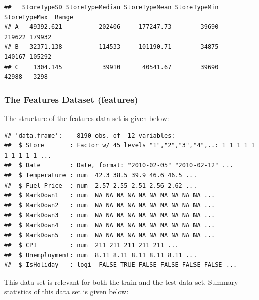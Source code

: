 \documentclass[]{article}
\begin{document}
\begin{verbatim}
##   StoreTypeSD StoreTypeMedian StoreTypeMean StoreTypeMin StoreTypeMax  Range
## A   49392.621          202406     177247.73        39690       219622 179932
## B   32371.138          114533     101190.71        34875       140167 105292
## C    1304.145           39910      40541.67        39690        42988   3298
\end{verbatim}

\subsubsection{The Features Dataset
(features)}\label{the-features-dataset-features}

The structure of the features data set is given below:

\begin{verbatim}
## 'data.frame':    8190 obs. of  12 variables:
##  $ Store       : Factor w/ 45 levels "1","2","3","4",..: 1 1 1 1 1 1 1 1 1 1 ...
##  $ Date        : Date, format: "2010-02-05" "2010-02-12" ...
##  $ Temperature : num  42.3 38.5 39.9 46.6 46.5 ...
##  $ Fuel_Price  : num  2.57 2.55 2.51 2.56 2.62 ...
##  $ MarkDown1   : num  NA NA NA NA NA NA NA NA NA NA ...
##  $ MarkDown2   : num  NA NA NA NA NA NA NA NA NA NA ...
##  $ MarkDown3   : num  NA NA NA NA NA NA NA NA NA NA ...
##  $ MarkDown4   : num  NA NA NA NA NA NA NA NA NA NA ...
##  $ MarkDown5   : num  NA NA NA NA NA NA NA NA NA NA ...
##  $ CPI         : num  211 211 211 211 211 ...
##  $ Unemployment: num  8.11 8.11 8.11 8.11 8.11 ...
##  $ IsHoliday   : logi  FALSE TRUE FALSE FALSE FALSE FALSE ...
\end{verbatim}

This data set is relevant for both the train and the test data set.
Summary statistics of this data set is given below:
\end{document}
